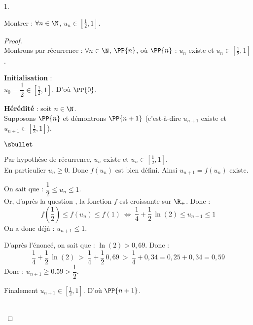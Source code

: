 \documentclass[11pt]{article}%
\begin{document}
\begin{noliste}{1.}
\setlength{\itemsep}{2mm}
\setcounter{enumi}{8}
\item Montrer : $\forall n\in \N$, $u_n \in \left[\frac{1}{2},
    1\right]$.

  \begin{proof}~\\
    Montrons par récurrence : $\forall n\in\N$, $\PP{n}$, \quad où
    \quad $\PP{n}$ : $u_n$ existe et $u_n\in
    \left[\frac{1}{2},1\right]$.
    \begin{noliste}{\fitem}
    \item {\bf Initialisation} : \\
      $u_0=\dfrac{1}{2} \in \left[\frac{1}{2}, 1\right]$. D'où
      $\PP{0}$.
      
    \item {\bf Hérédité} : soit $n\in\N$.\\
      Supposons $\PP{n}$ et démontrons $\PP{n+1}$ (c'est-à-dire
      $u_{n+1}$ existe et $u_{n+1}\in \left[\frac{1}{2},1\right]$).
 \begin{noliste}{$\sbullet$}
 \item Par hypothèse de récurrence, $u_n$ existe et $u_n\in \left[
 \frac{1}{2},1\right]$.\\
 En particulier $u_n\geq 0$. Donc $f(u_n)$ est bien défini. 
 Ainsi $u_{n+1}=f(u_n)$ existe.
 
 \item On sait que : $\dfrac{1}{2} \leq u_n \leq 1$.\\
 Or, d'après la question , la fonction $f$ est croissante
 sur $\R_+$. 
 Donc :
 \[
  f\left(\dfrac{1}{2}\right) \leq f(u_n) \leq f(1) \ 
  \Leftrightarrow \ 
  \dfrac{1}{4} + \dfrac{1}{2}\, \ln(2) \leq u_{n+1} \leq 1
 \]
 On a donc déjà : $u_{n+1} \leq 1$.
 
 \item D'après l'énoncé, on sait que : $\ln(2)>0,69$. Donc :
 \[
  \dfrac{1}{4} + \dfrac{1}{2} \, \ln(2) \ > \ \dfrac{1}{4} + 
  \dfrac{1}{2} \, 0,69 \ > \ \dfrac{1}{4} + 0,34 = 0,25+0,34 = 0,59
 \]
 Donc : $u_{n+1} \geq 0.59 > \dfrac{1}{2}$.
 \end{noliste}
 
 
  Finalement $u_{n+1}\in \left[\frac{1}{2},1\right]$. D'où $\PP{n+1}$.
 \end{noliste}
 ~\\[-1cm]
\end{proof}


\end{noliste}
\end{document}
